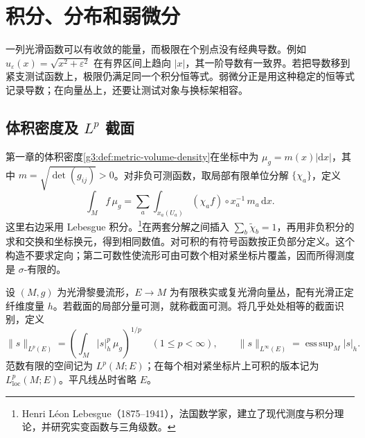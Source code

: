 
% 
% 

\section{积分、分布和弱微分}
\label{g3:sec:1101}

一列光滑函数可以有收敛的能量，而极限在个别点没有经典导数。例如 \(u_\varepsilon(x)=\sqrt{x^2+\varepsilon^2}\) 在有界区间上趋向 \(|x|\)，其一阶导数有一致界。若把导数移到紧支测试函数上，极限仍满足同一个积分恒等式。弱微分正是用这种稳定的恒等式记录导数；在向量丛上，还要让测试对象与换标架相容。

\subsection{\texorpdfstring{体积密度及 \(L^p\) 截面}{体积密度及 Lᵖ 截面}}
\label{g3:subsec:1101:01}
第一章的体积密度\cref{g3:def:metric-volume-density}在坐标中为 \(\mu_g=m(x)|\mathrm dx|\)，其中 \(m=\sqrt{\det(g_{ij})}>0\)。对非负可测函数，取局部有限单位分解 \(\{\chi_a\}\)，定义
\[
	\int_M f\,\mu_g=\sum_a\int_{x_a(U_a)}(\chi_af)\circ x_a^{-1}\,m_a\,\mathrm dx.
\]
这里右边采用 Lebesgue 积分。\footnote{Henri Léon Lebesgue（1875--1941），法国数学家，建立了现代测度与积分理论，并研究实变函数与三角级数。}在两套分解之间插入 \(\sum_b\widetilde\chi_b=1\)，再用非负积分的求和交换和坐标换元，得到相同数值。对可积的有符号函数按正负部分定义。这个构造不要求定向；第二可数性使流形可由可数个相对紧坐标片覆盖，因而所得测度是 \(\sigma\)-有限的。

\begin{definition}\label{g3:def:lp-sections}
	设 \((M,g)\) 为光滑黎曼流形，\(E\to M\) 为有限秩实或复光滑向量丛，配有光滑正定纤维度量 \(h\)。若截面的局部分量可测，就称截面可测。将几乎处处相等的截面识别，定义
	\[
		\|s\|_{L^p(E)}=\left(\int_M|s|_h^p\,\mu_g\right)^{1/p}
		\quad(1\le p<\infty),\qquad
		\|s\|_{L^\infty(E)}=\mathop{\mathrm{ess\,sup}}_M|s|_h.
	\]
	范数有限的空间记为 \(L^p(M;E)\)；在每个相对紧坐标片上可积的版本记为 \(L^p_{\mathrm{loc}}(M;E)\)。平凡线丛时省略 \(E\)。
\end{definition}

